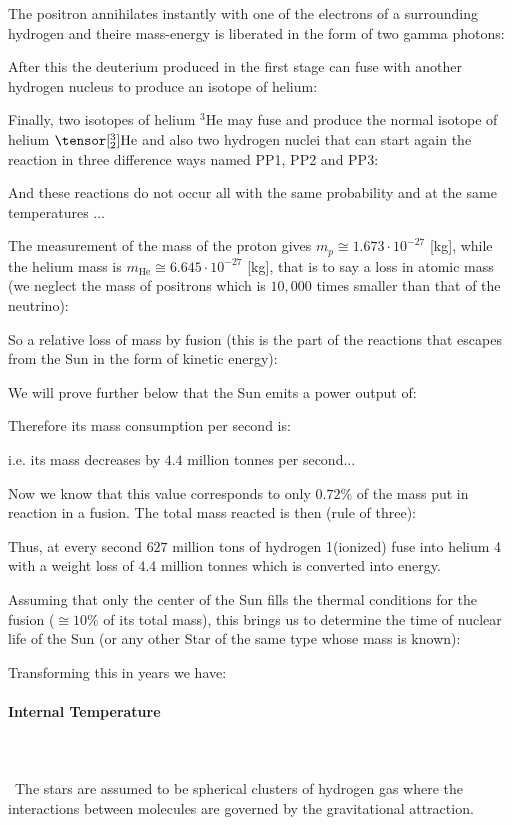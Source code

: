 	The positron annihilates instantly with one of the electrons of a surrounding hydrogen and theire mass-energy is liberated in the form of two gamma photons:
	
	After this the deuterium produced in the first stage can fuse with another hydrogen nucleus to produce an isotope of helium:
	
	Finally, two isotopes of helium $^3\mathrm{He}$  may fuse and produce the normal isotope of helium $\tensor[^{3}_2]{\mathrm{He}}{}$ and also two hydrogen nuclei that can start again the reaction in three difference ways named PP1, PP2 and PP3:
	
	And these reactions do not occur all with the same probability and at the same temperatures ...
	
	The measurement of the mass of the proton gives $m_p\cong 1.673\cdot 10^{-27}$ [kg], while the helium mass is   $m_{\text{He}}\cong 6.645\cdot 10^{-27}$ [kg], that is to say a loss in atomic mass (we neglect the mass of positrons which is $10,000$ times smaller than that of the neutrino):
	
	So a relative loss of mass by fusion (this is the part of the reactions that escapes from the Sun in the form of kinetic energy):
	
	We will prove further below that the Sun emits a power output of:
	
	Therefore its mass consumption per second is:
	
	i.e. its mass decreases by $4.4$ million tonnes per second...
	
	Now we know that this value corresponds to only $0.72\%$ of the mass put in reaction in a fusion. The total mass reacted  is then (rule of three):
	
	Thus, at every second $627$ million tons of hydrogen 1(ionized) fuse into helium 4 with a weight loss of $4.4$ million tonnes which is converted into energy.
	
	Assuming that only the center of the Sun fills the thermal conditions for the fusion ($\cong 10\%$ of its total mass), this brings us to determine the time of nuclear life of the Sun (or any other Star of the same type whose mass is known):
	
	Transforming this in years we have:
	
	
	\paragraph{Internal Temperature}\mbox{}\\\\\
	The stars are assumed to be spherical clusters of hydrogen gas where the interactions between molecules are governed by the gravitational attraction.


